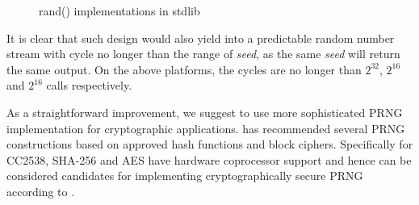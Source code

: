 \begin{figure}

\caption{rand() implementations in stdlib}
\label{rand}
\end{figure}

It is clear that such design would also yield into a predictable random number stream with cycle no longer than the range of \textit{seed}, as the same \textit{seed} will return the same output. On the above platforms, the cycles are no longer than $2^{32}$, $2^{16}$ and $2^{16}$ calls respectively.

As a straightforward improvement, we suggest to use more sophisticated PRNG implementation for cryptographic applications. \cite{NISTPRNG} has recommended several PRNG constructions based on approved hash functions and block ciphers. Specifically for CC2538, SHA-256 and AES have hardware coprocessor support and hence can be considered candidates for implementing cryptographically secure PRNG according to \cite{NISTPRNG}.

